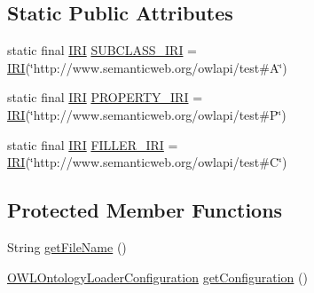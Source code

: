 \subsection*{Static Public Attributes}
\begin{DoxyCompactItemize}
\item 
static final \hyperlink{classorg_1_1semanticweb_1_1owlapi_1_1model_1_1_i_r_i}{I\-R\-I} \hyperlink{classorg_1_1semanticweb_1_1owlapi_1_1api_1_1test_1_1axioms_1_1_sub_class_of_untyped_some_values_from_test_case_a71c8c25d5d3245ebb88195cc8887e38f}{S\-U\-B\-C\-L\-A\-S\-S\-\_\-\-I\-R\-I} = \hyperlink{classorg_1_1semanticweb_1_1owlapi_1_1model_1_1_i_r_i}{I\-R\-I}(\char`\"{}http\-://www.\-semanticweb.\-org/owlapi/test\#A\char`\"{})
\item 
static final \hyperlink{classorg_1_1semanticweb_1_1owlapi_1_1model_1_1_i_r_i}{I\-R\-I} \hyperlink{classorg_1_1semanticweb_1_1owlapi_1_1api_1_1test_1_1axioms_1_1_sub_class_of_untyped_some_values_from_test_case_a06c055e96b9360dee6fdfc5d793282f0}{P\-R\-O\-P\-E\-R\-T\-Y\-\_\-\-I\-R\-I} = \hyperlink{classorg_1_1semanticweb_1_1owlapi_1_1model_1_1_i_r_i}{I\-R\-I}(\char`\"{}http\-://www.\-semanticweb.\-org/owlapi/test\#P\char`\"{})
\item 
static final \hyperlink{classorg_1_1semanticweb_1_1owlapi_1_1model_1_1_i_r_i}{I\-R\-I} \hyperlink{classorg_1_1semanticweb_1_1owlapi_1_1api_1_1test_1_1axioms_1_1_sub_class_of_untyped_some_values_from_test_case_a07834169910a142d371374fd52f2a912}{F\-I\-L\-L\-E\-R\-\_\-\-I\-R\-I} = \hyperlink{classorg_1_1semanticweb_1_1owlapi_1_1model_1_1_i_r_i}{I\-R\-I}(\char`\"{}http\-://www.\-semanticweb.\-org/owlapi/test\#C\char`\"{})
\end{DoxyCompactItemize}
\subsection*{Protected Member Functions}
\begin{DoxyCompactItemize}
\item 
String \hyperlink{classorg_1_1semanticweb_1_1owlapi_1_1api_1_1test_1_1axioms_1_1_sub_class_of_untyped_some_values_from_test_case_a24ced07ed6fb4bc031aa42e48f038493}{get\-File\-Name} ()
\item 
\hyperlink{classorg_1_1semanticweb_1_1owlapi_1_1model_1_1_o_w_l_ontology_loader_configuration}{O\-W\-L\-Ontology\-Loader\-Configuration} \hyperlink{classorg_1_1semanticweb_1_1owlapi_1_1api_1_1test_1_1axioms_1_1_sub_class_of_untyped_some_values_from_test_case_abb97231c6d9ef13530be2fee4a6cb358}{get\-Configuration} ()
\end{DoxyCompactItemize}


